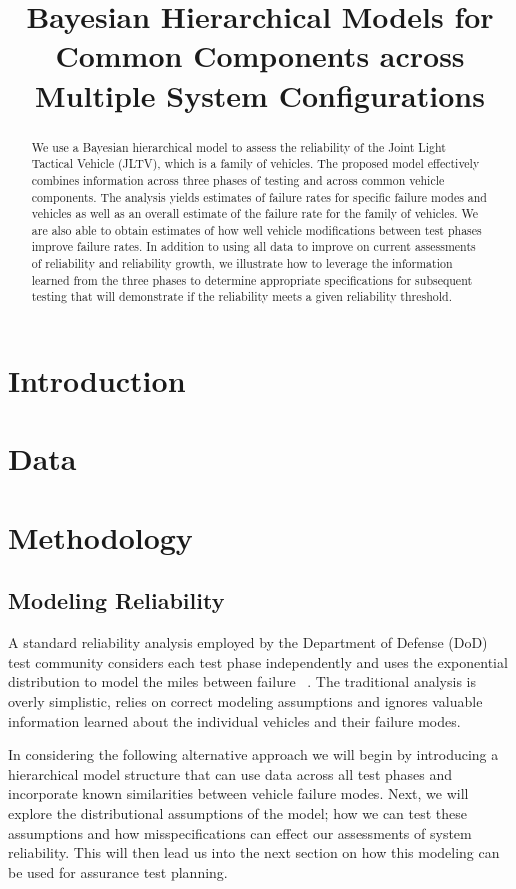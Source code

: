 \documentclass[12pt]{article}
\begin{document}
\title{Bayesian Hierarchical Models for Common Components across Multiple System Configurations}

\begin{abstract}
    We use a Bayesian hierarchical model to assess the reliability of the Joint Light Tactical
    Vehicle (JLTV), which is a family of vehicles. The proposed model effectively combines information
    across three phases of testing and across common vehicle components. The analysis yields
    estimates of failure rates for specific failure modes and vehicles as well as an overall estimate of the
    failure rate for the family of vehicles. We are also able to obtain estimates of how well vehicle
    modifications between test phases improve failure rates. In addition to using all data to improve on
    current assessments of reliability and reliability growth, we illustrate how to leverage the information
    learned from the three phases to determine appropriate specifications for subsequent testing that will
    demonstrate if the reliability meets a given reliability threshold.
\end{abstract}


\section{Introduction}

\section{Data}


\section{Methodology}

\subsection{Modeling Reliability}
A standard reliability analysis employed by the Department of Defense (DoD) test
community considers each test phase independently and uses the exponential
distribution to model the miles between failure ~\cite{ref1}. The traditional
analysis is overly simplistic, relies on correct modeling assumptions
and ignores valuable information learned about the individual vehicles and their
failure modes.

In considering the following alternative approach we will begin by introducing a
hierarchical model structure that can use data across all test phases and
incorporate known similarities between vehicle failure modes.  Next, we will
explore the distributional assumptions of the model; how we can test these
assumptions and how misspecifications can effect our assessments of system
reliability.  This will then lead us into the next section on how this modeling
can be used for assurance test planning.
\end{document}
